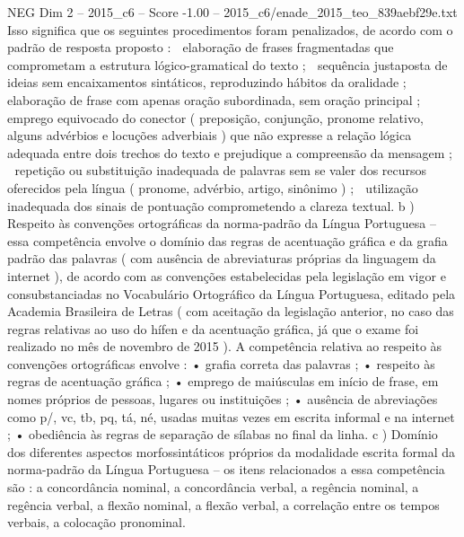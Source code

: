 \begin{textsample}{NEG Dim 2 – 2015\_c6 – Score -1.00 – 2015\_c6/enade\_2015\_teo\_839aebf29e.txt}
Isso significa que os seguintes procedimentos foram penalizados, de acordo com o padrão de resposta proposto :  elaboração de frases fragmentadas que comprometam a estrutura lógico-gramatical do texto ;  sequência justaposta de ideias sem encaixamentos sintáticos, reproduzindo hábitos da oralidade ;  elaboração de frase com apenas oração subordinada, sem oração principal ;  emprego equivocado do conector ( preposição, conjunção, pronome relativo, alguns advérbios e locuções adverbiais ) que não expresse a relação lógica adequada entre dois trechos do texto e prejudique a compreensão da mensagem ;  repetição ou substituição inadequada de palavras sem se valer dos recursos oferecidos pela língua ( pronome, advérbio, artigo, sinônimo ) ;  utilização inadequada dos sinais de pontuação comprometendo a clareza textual. b ) Respeito às convenções ortográficas da norma-padrão da Língua Portuguesa – essa competência envolve o domínio das regras de acentuação gráfica e da grafia padrão das palavras ( com ausência de abreviaturas próprias da linguagem da internet ), de acordo com as convenções estabelecidas pela legislação em vigor e consubstanciadas no Vocabulário Ortográfico da Língua Portuguesa, editado pela Academia Brasileira de Letras ( com aceitação da legislação anterior, no caso das regras relativas ao uso do hífen e da acentuação gráfica, já que o exame foi realizado no mês de novembro de 2015 ).
A competência relativa ao respeito às convenções ortográficas envolve : • grafia correta das palavras ; • respeito às regras de acentuação gráfica ; • emprego de maiúsculas em início de frase, em nomes próprios de pessoas, lugares ou instituições ; • ausência de abreviações como p/, vc, tb, pq, tá, né, usadas muitas vezes em escrita informal e na internet ; • obediência às regras de separação de sílabas no final da linha. c ) Domínio dos diferentes aspectos morfossintáticos próprios da modalidade escrita formal da norma-padrão da Língua Portuguesa – os itens relacionados a essa competência são : a concordância nominal, a concordância verbal, a regência nominal, a regência verbal, a flexão nominal, a flexão verbal, a correlação entre os tempos verbais, a colocação pronominal.

\end{textsample}
